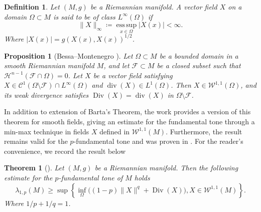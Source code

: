 \documentclass{article}
\newtheorem{theorem}{Theorem}[section]
\newtheorem{prop}[thm]{Proposition}
\newtheorem{definition}[thm]{Definition}
\begin{document}
\begin{definition}
Let $(M, g)$ be a Riemannian manifold. A vector field $X$ on a domain $\Omega \subset M$ is said to be of class $L^{\infty}(\Omega)$ if
\[
\|X\|_\infty \coloneqq \operatorname*{ess\,sup}_{x\in \Omega} |X(x)| < \infty.
\]
Where $|X(x)| = g(X(x),X(x))^{1/2}$.
\end{definition} 
\begin{prop}[Bessa--Montenegro \cite{BessaMontenegro}]\label{LemmaSobolev}
Let $\Omega \subset M$ be a bounded domain in a smooth Riemannian manifold $M$,
and let $\mathcal{F} \subset M$ be a closed subset such that
$\mathcal{H}^{n-1}(\mathcal{F} \cap \Omega) = 0$.
Let $X$ be a vector field satisfying
$X \in \mathcal{C}^1(\Omega \setminus \mathcal{F}) \cap L^{\infty}(\Omega)$
and $\operatorname{div}(X) \in L^{1}(\Omega)$.
Then $X \in \mathcal{W}^{1,1}(\Omega)$, and its weak divergence satisfies
$\operatorname{Div}(X) = \operatorname{div}(X)$ in $\Omega \setminus \mathcal{F}$.
\end{prop}
In addition to extension of Barta's Theorem, the work \cite{BessaMontenegro} provides a version of this theorem for smooth fields, giving an estimate for the fundamental tone through a min-max technique in fields $X$ defined in $\mathcal{W}^{1,1}(M)$. Furthermore, the result \cite[Theorem 1.7]{BessaMontenegro} remains valid for the $p$-fundamental tone and was proven in \cite[Theorem 1.3]{LimaMontenegroSantos2010}. For the reader’s convenience, we record the result below
\begin{theorem}[\cite{LimaMontenegroSantos2010}]\label{Thm:BMS}
Let $(M, g)$ be a Riemannian manifold. Then the following estimate for the $p$-fundamental tone of $M$ holds
\[
\lambda_{1,p}(M) \geq \sup \left\{\inf_{\Omega} \bigl( (1-p)\|X\|^q+\operatorname{Div}(X) \bigr), X \in \mathcal{W}^{1,1}(M)\right\}.
\]
Where $1 / p+1 / q=1$.    
\end{theorem}
\end{document}
